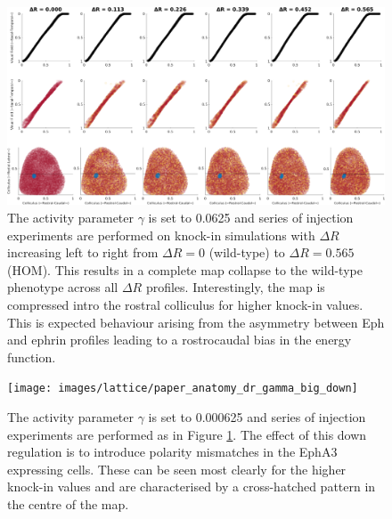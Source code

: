 \begin{landscape}
	\begin{figure}
		\centering
		\includegraphics[width=1.6\textwidth]{images/lattice/paper_anatomy_dr_gamma_big_up}
		\captionsetup{width=.75\linewidth}
		\def\c{The activity parameter $\gamma$ is set to 0.0625 and series of injection experiments are performed on knock-in simulations with $\Delta R$ increasing left to right from $\Delta R=0$ (wild-type) to $\Delta R=0.565$ (HOM).  }
		\caption[\c]{\c This results in a complete map collapse to the wild-type phenotype across all $\Delta R$ profiles. Interestingly, the map is compressed intro the rostral colliculus for higher knock-in values. This is expected behaviour arising from the asymmetry between Eph and ephrin profiles leading to a rostrocaudal bias in the energy function. \label{fig:activitya}}
	\end{figure}
\end{landscape}

\begin{landscape}
	\begin{figure}
		\centering
		\texttt{[image: images/lattice/paper\_anatomy\_dr\_gamma\_big\_down]}
		\captionsetup{width=.75\linewidth}
		\def\c{The activity parameter $\gamma$ is set to 0.000625 and series of injection experiments are performed as in Figure \ref{fig:activitya}. The effect of this down regulation is to introduce polarity mismatches in the EphA3 expressing cells. }
		\caption[\c]{\c These can be seen most clearly for the higher knock-in values and are characterised by a cross-hatched pattern in the centre of the map. \label{fig:activityb}}
	\end{figure}
\end{landscape}

